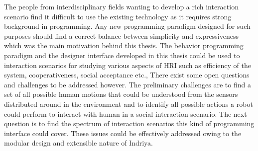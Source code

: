 The people from interdisciplinary fields wanting to develop a rich interaction scenario find it difficult to use the existing technology as it requires strong background in programming. Any new programming paradigm designed for such purposes should find a correct balance between simplicity and expressiveness which was the main motivation behind this thesis. The behavior programming paradigm and the designer interface developed in this thesis could be used to interaction scenarios for studying various aspects of HRI such as efficiency of the system, cooperativeness, social acceptance etc., There exist some open questions and challenges to be addressed however. The preliminary challenges are to find a set of all possible human motions that could be understood from the sensors distributed around in the environment and to identify all possible actions a robot could perform to interact with human in a social interaction scenario. The next question is to find the spectrum of interaction scenarios this kind of programming interface could cover. These issues could be effectively addressed owing to the modular design and extensible nature of Indriya.